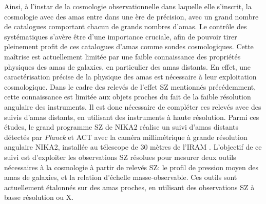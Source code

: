 Ainsi, à l'instar de la cosmologie observationnelle dans laquelle elle s'inscrit, la cosmologie avec des amas entre dans une ère de précision, avec un grand nombre de catalogues comportant chacun de grands nombres d'amas.
Le contrôle des systématiques s’avère être d’une importance cruciale, afin de pouvoir tirer pleinement profit de ces catalogues d'amas comme sondes cosmologiques.
Cette maîtrise est actuellement limitée par une faible connaissance des propriétés physiques des amas de galaxies, en particulier des amas distants.
En effet, une caractérisation précise de la physique des amas est nécessaire à leur exploitation cosmologique.
Dans le cadre des relevés de l'effet SZ mentionnés précédemment, cette connaissance est limitée aux objets proches du fait de la faible résolution angulaire des instruments.
Il est donc nécessaire de compléter ces relevés avec des suivis d'amas distants, en utilisant des instruments à haute résolution.
Parmi ces études, le grand programme SZ de NIKA2 réalise un suivi d'amas distants détectés par \textit{Planck} et ACT avec la caméra millimétrique à grande résolution angulaire NIKA2, installée au télescope de 30 mètres de l'IRAM \cite{perotto_calibration_2020}.
L'objectif de ce suivi est d'exploiter les observations SZ résolues pour mesurer deux outils nécessaires à la cosmologie à partir de relevés SZ: le profil de pression moyen des amas de galaxies, et la relation d'échelle masse-observable.
Ces outils sont actuellement étalonnés sur des amas proches, en utilisant des observations SZ à basse résolution ou X.

